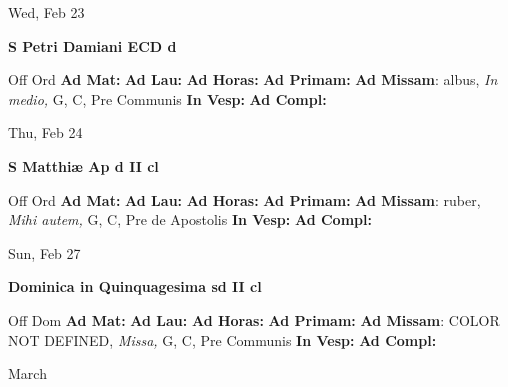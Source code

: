 \documentclass[10pt]{memoir}
\begin{document}
\begin{center}
\begin{minipage}{3.5in}
\vspace{2em}
\begin{center}Wed, Feb 23
\end{center}
\textbf{ \large S Petri Damiani ECD
\textnormal{\normalsize d}}

\begin{justify}Off Ord
\textbf{Ad Mat: }
\textbf{Ad Lau: }
\textbf{Ad Horas: }
\textbf{Ad Primam: }\textbf{Ad Missam}: albus, \textit{In medio,} G, C, Pre Communis
\textbf{In Vesp: }
\textbf{Ad Compl: }
\end{justify}
\end{minipage}
\end{center}

\begin{center}
\begin{minipage}{3.5in}
\vspace{2em}
\begin{center}Thu, Feb 24
\end{center}
\textbf{ \large S Matthiæ Ap
\textnormal{\normalsize d II cl}}

\begin{justify}Off Ord
\textbf{Ad Mat: }
\textbf{Ad Lau: }
\textbf{Ad Horas: }
\textbf{Ad Primam: }\textbf{Ad Missam}: ruber, \textit{Mihi autem,} G, C, Pre de Apostolis
\textbf{In Vesp: }
\textbf{Ad Compl: }
\end{justify}
\end{minipage}
\end{center}

\begin{center}
\begin{minipage}{3.5in}
\vspace{2em}
\begin{center}Sun, Feb 27
\end{center}
\textbf{ \large Dominica in Quinquagesima
\textnormal{\normalsize sd II cl}}

\begin{justify}Off Dom
\textbf{Ad Mat: }
\textbf{Ad Lau: }
\textbf{Ad Horas: }
\textbf{Ad Primam: }\textbf{Ad Missam}: COLOR NOT DEFINED, \textit{Missa,} G, C, Pre Communis
\textbf{In Vesp: }
\textbf{Ad Compl: }
\end{justify}
\end{minipage}
\end{center}

\begin{center}
\pagebreak
\thispagestyle{empty}
{\Huge March}
\end{center}
                    
\end{document}
